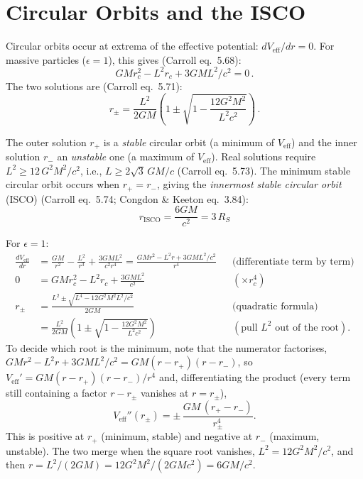 \section{Circular Orbits and the ISCO}
\label{sec:circular_orbits}

Circular orbits occur at extrema of the effective potential:
$dV_{\mathrm{eff}}/dr = 0$.  For massive particles ($\epsilon = 1$),
this gives (Carroll eq.~5.68):
\begin{equation}
    GM r_c^2 - L^2 r_c + 3GML^2/c^2 = 0 \,.
    \label{eq:circular_condition}
\end{equation}
The two solutions are (Carroll eq.~5.71):
\begin{equation}
    r_\pm = \frac{L^2}{2GM}
    \left(1 \pm \sqrt{1 - \frac{12G^2M^2}{L^2 c^2}}\right) \,.
    \label{eq:circular_radii}
\end{equation}

The outer solution $r_+$ is a \emph{stable} circular orbit (a minimum of
$V_{\mathrm{eff}}$) and the inner solution $r_-$ an \emph{unstable} one
(a maximum of $V_{\mathrm{eff}}$).
Real solutions require $L^2 \geq 12\,G^2M^2/c^2$, i.e.,
$L \geq 2\sqrt{3}\,GM/c$ (Carroll eq.~5.73).  The minimum stable circular
orbit occurs when $r_+ = r_-$, giving the \emph{innermost stable
circular orbit} (ISCO) (Carroll eq.~5.74; Congdon \& Keeton eq.~3.84):
\begin{equation}
    \boxed{r_{\mathrm{ISCO}} = \frac{6GM}{c^2} = 3\, R_S}
    \label{eq:ISCO}
\end{equation}

\begin{derivation}
For $\epsilon = 1$:
\begin{align*}
\frac{dV_{\mathrm{eff}}}{dr}
  &= \frac{GM}{r^2} - \frac{L^2}{r^3} + \frac{3GML^2}{c^2r^4}
   = \frac{GMr^2 - L^2r + 3GML^2/c^2}{r^4}
  && \text{(differentiate term by term)} \\
0 &= GMr_c^2 - L^2r_c + \frac{3GML^2}{c^2}
  && (\times r_c^4) \\
r_\pm &= \frac{L^2 \pm \sqrt{L^4 - 12G^2M^2L^2/c^2}}{2GM}
  && \text{(quadratic formula)} \\
  &= \frac{L^2}{2GM}\left(1 \pm \sqrt{1 - \frac{12G^2M^2}{L^2c^2}}\right)
  && (\text{pull } L^2 \text{ out of the root}) .
\end{align*}
To decide which root is the minimum, note that the numerator factorises,
$GMr^2 - L^2r + 3GML^2/c^2 = GM(r - r_+)(r - r_-)$, so
$V_{\mathrm{eff}}' = GM(r - r_+)(r - r_-)/r^4$ and, differentiating the
product (every term still containing a factor $r - r_\pm$ vanishes at
$r = r_\pm$),
\[
V_{\mathrm{eff}}''(r_\pm) = \pm\,\frac{GM\,(r_+ - r_-)}{r_\pm^4} .
\]
This is positive at $r_+$ (minimum, stable) and negative at $r_-$
(maximum, unstable).  The two merge when the square root vanishes,
$L^2 = 12G^2M^2/c^2$, and then
$r = L^2/(2GM) = 12G^2M^2/(2GMc^2) = 6GM/c^2$.
\end{derivation}

